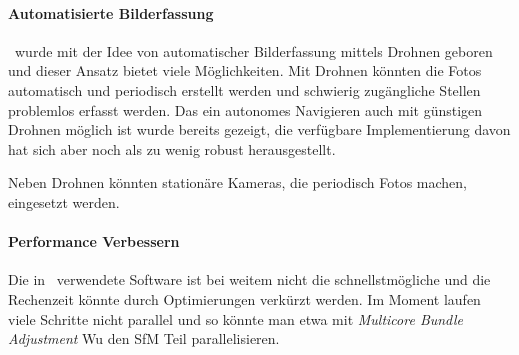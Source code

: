 		\paragraph{Automatisierte Bilderfassung}
			\dronarch\ wurde mit der Idee von automatischer Bilderfassung mittels Drohnen geboren und dieser Ansatz bietet viele Möglichkeiten. Mit Drohnen könnten die Fotos automatisch und periodisch erstellt werden und schwierig zugängliche Stellen problemlos erfasst werden. Das ein autonomes Navigieren auch mit günstigen Drohnen möglich ist wurde bereits gezeigt, die verfügbare Implementierung davon hat sich aber noch als zu wenig robust herausgestellt.
			
			Neben Drohnen könnten stationäre Kameras, die periodisch Fotos machen, eingesetzt werden.

		\paragraph{Performance Verbessern}
			Die in \dronarch\ verwendete Software ist bei weitem nicht die schnellstmögliche und die Rechenzeit könnte durch Optimierungen verkürzt werden. Im Moment laufen viele Schritte nicht parallel und so könnte man etwa mit \emph{Multicore Bundle Adjustment} Wu \etal{} den SfM Teil parallelisieren.
	